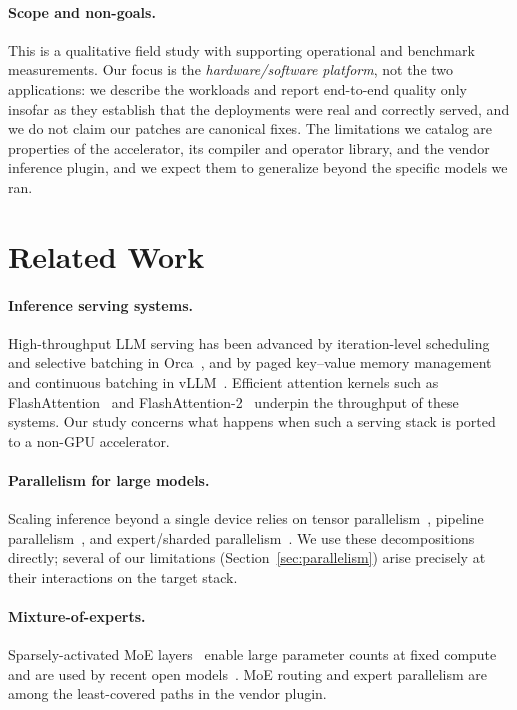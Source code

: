 \documentclass{article}
\begin{document}
\paragraph{Scope and non-goals.} This is a qualitative field study with
supporting operational and benchmark measurements. Our focus is the
\emph{hardware/software platform}, not the two applications: we describe the
workloads and report end-to-end quality only insofar as they establish that the
deployments were real and correctly served, and we do not claim our patches are
canonical fixes. The limitations we catalog are properties of the accelerator,
its compiler and operator library, and the vendor inference plugin, and we expect
them to generalize beyond the specific models we ran.

\section{Related Work}
\label{sec:related}
\paragraph{Inference serving systems.} High-throughput LLM serving has been
advanced by iteration-level scheduling and selective batching in
Orca~\cite{orca}, and by paged key--value memory management and continuous
batching in vLLM~\cite{vllm}. Efficient attention kernels such as
FlashAttention~\cite{flashattention} and FlashAttention-2~\cite{flashattention2}
underpin the throughput of these systems. Our study concerns what happens when
such a serving stack is ported to a non-GPU accelerator.

\paragraph{Parallelism for large models.} Scaling inference beyond a single
device relies on tensor parallelism~\cite{megatron}, pipeline
parallelism~\cite{gpipe}, and expert/sharded parallelism~\cite{gshard}. We use
these decompositions directly; several of our limitations
(Section~\ref{sec:parallelism}) arise precisely at their interactions on the
target stack.

\paragraph{Mixture-of-experts.} Sparsely-activated MoE
layers~\cite{shazeer,switch} enable large parameter counts at fixed compute and
are used by recent open models~\cite{mixtral,deepseekv3,deepseekv2}. MoE routing
and expert parallelism are among the least-covered paths in the vendor plugin.
\end{document}
